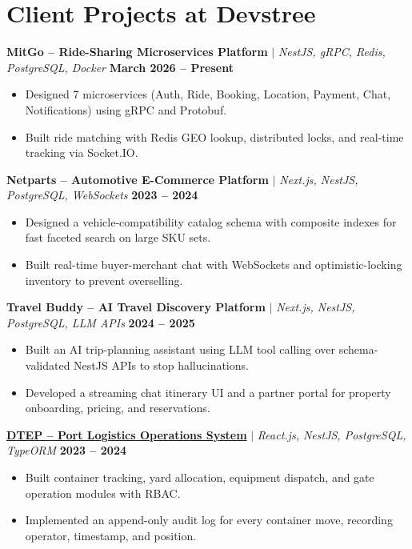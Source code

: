 \documentclass[letterpaper,10pt]{article}
\newcommand{\projectHeading}[3]{%
    \vspace{2pt}\textbf{#1} $|$ \textit{#2} \hfill \textbf{#3}\par
}
\begin{document}

\section{Client Projects at Devstree}

\projectHeading
    {MitGo -- Ride-Sharing Microservices Platform}
    {NestJS, gRPC, Redis, PostgreSQL, Docker}
    {March 2026 -- Present}
\begin{itemize}
    \item Designed 7 microservices (Auth, Ride, Booking, Location, Payment, Chat, Notifications) using gRPC and Protobuf.
    \item Built ride matching with Redis GEO lookup, distributed locks, and real-time tracking via Socket.IO.
\end{itemize}

\projectHeading
    {Netparts -- Automotive E-Commerce Platform}
    {Next.js, NestJS, PostgreSQL, WebSockets}
    {2023 -- 2024}
\begin{itemize}
    \item Designed a vehicle-compatibility catalog schema with composite indexes for fast faceted search on large SKU sets.
    \item Built real-time buyer-merchant chat with WebSockets and optimistic-locking inventory to prevent overselling.
\end{itemize}

\projectHeading
    {Travel Buddy -- AI Travel Discovery Platform}
    {Next.js, NestJS, PostgreSQL, LLM APIs}
    {2024 -- 2025}
\begin{itemize}
    \item Built an AI trip-planning assistant using LLM tool calling over schema-validated NestJS APIs to stop hallucinations.
    \item Developed a streaming chat itinerary UI and a partner portal for property onboarding, pricing, and reservations.
\end{itemize}

\projectHeading
    {\href{https://hungthuanport.com/}{DTEP -- Port Logistics Operations System}}
    {React.js, NestJS, PostgreSQL, TypeORM}
    {2023 -- 2024}
\begin{itemize}
    \item Built container tracking, yard allocation, equipment dispatch, and gate operation modules with RBAC.
    \item Implemented an append-only audit log for every container move, recording operator, timestamp, and position.
\end{itemize}
\end{document}
